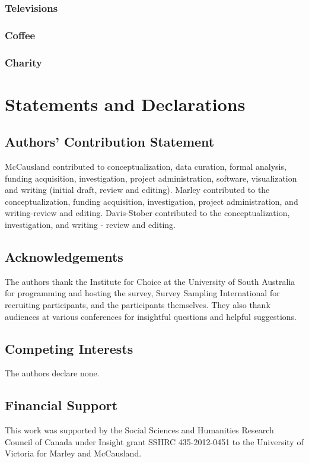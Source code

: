 \documentclass[11pt,letter]{article}
\begin{document}
\subsubsection{Televisions}



\subsubsection{Coffee}



\subsubsection{Charity}



\section*{Statements and Declarations}

\subsection*{Authors' Contribution Statement}

McCausland contributed to conceptualization, data curation, formal analysis, funding acquisition, investigation, project administration, software, visualization and writing (initial draft, review and editing).
Marley contributed to the conceptualization, funding acquisition, investigation, project administration, and writing-review and editing.
Davis-Stober contributed to the conceptualization, investigation, and writing - review and editing.

\subsection*{Acknowledgements}

The authors thank the Institute for Choice at the University of South Australia for programming and hosting the survey, Survey Sampling International for recruiting participants, and the participants themselves.
They also thank audiences at various conferences for insightful questions and helpful suggestions.

\subsection*{Competing Interests}

The authors declare none.

\subsection*{Financial Support}

This work was supported by the Social Sciences and Humanities Research Council of Canada under Insight grant SSHRC 435-2012-0451 to the University of Victoria for Marley and McCausland.



\end{document}
